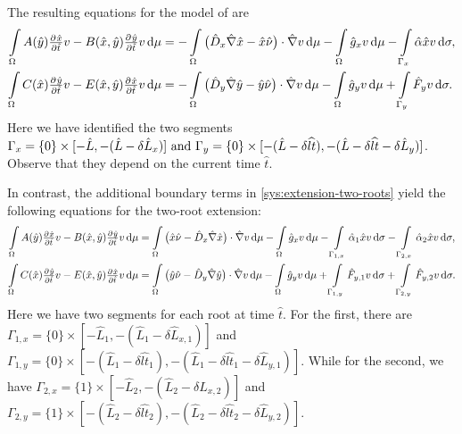 \documentclass[11pt]{article}
\numberwithin{equation}{section}
\begin{document}
The resulting equations for the model of \cite{Ptashnyk-2011} are
\begin{equation}
\label{eq:var-time-model-1}
\begin{aligned}
    \int\limits_\Omega
    A(\hat y) \pd{\hat{x}}{\hat{t}} v 
    -
    B(\hat x, \hat y) \pd{\hat y}{\hat t} v
    \dif\mu
    &=
    -\int\limits_\Omega 
    \big( \hat{D}_x \hat{\nabla} \hat{x} - \hat{x}\hat{\nu}\big) \cdot \hat{\nabla} v \dif\mu
    -\int\limits_\Omega \hat{g}_x v \dif\mu
    -\int\limits_{\Gamma_{x}}    \hat{\alpha} \hat{x} v    \dif \sigma,
    \\
    \int\limits_\Omega
    C(\hat{x})  \pd{\hat{y}}{\hat{t}} v 
    -
    E(\hat{x},\hat{y})  \pd{\hat x}{\hat t} v
    \dif\mu
    &=
    -\int\limits_\Omega 
    \big(\hat{D}_y \hat{\nabla} \hat{y} - \hat{y}\hat{\nu} \big) \cdot \hat{\nabla} v \dif\mu
    -\int\limits_\Omega \hat{g}_y v \dif\mu
    +\int\limits_{\Gamma_{y}}    \hat{F}_y v    \dif \sigma.
\end{aligned}
\end{equation}
Here we have identified the two segments \(\Gamma_{x} = \{0\}\times [-\hat{L}, -(\hat{L}-\delta \hat{L}_x)]$ and $\Gamma_{y} = \{0\}\times [-(\hat{L} - \delta \widehat{lt}), -(\hat{L} - \delta \widehat{lt} - \delta \hat{L}_y)]\). Observe that they depend on the current time \(\hat t\).

In contrast, the additional boundary terms in \eqref{sys:extension-two-roots} yield the following equations for the two-root extension:
\begin{equation}
\label{eq:var-time-model-2}
\begin{aligned}
    \int\limits_\Omega
    A(\hat y) \pd{\hat{x}}{\hat{t}} v 
    -
    B(\hat x, \hat y) \pd{\hat y}{\hat t} v
    \dif\mu
    &=
    \int\limits_\Omega 
    \big( \hat{x}\hat{\nu} - \hat{D}_x \hat{\nabla} \hat{x}\big) \cdot \hat{\nabla} v \dif\mu
    -\int\limits_\Omega \hat{g}_x v \dif\mu
    -\int\limits_{\Gamma_{1,x}}    \hat{\alpha}_1 \hat{x} v    \dif \sigma
    -\int\limits_{\Gamma_{2,x}}    \hat{\alpha}_2 \hat{x} v    \dif \sigma,
    \\
    \int\limits_\Omega
    C(\hat{x})  \pd{\hat{y}}{\hat{t}} v 
    -
    E(\hat{x},\hat{y})  \pd{\hat x}{\hat t} v
    \dif\mu
    &=
    \int\limits_\Omega 
    \big(\hat{y}\hat{\nu} - \hat{D}_y \hat{\nabla} \hat{y} \big) \cdot \hat{\nabla} v \dif\mu
    -\int\limits_\Omega \hat{g}_y v \dif\mu
    +\int\limits_{\Gamma_{1,y}}    \hat{F}_{y,1} v    \dif \sigma
    +\int\limits_{\Gamma_{2,y}}    \hat{F}_{y,2} v    \dif \sigma.
\end{aligned}
\end{equation}
Here we have two segments for each root at time \(\hat t\). For the first, there are \(\Gamma_{1,x} = \{0\}\times [-\hat{L}_1,-(\hat{L}_1 - \delta \hat{L}_{x,1})]\) and \(\Gamma_{1,y} = \{0\}\times [-(\hat{L}_1 - \delta \widehat{lt}_1), -(\hat{L}_1 - \delta \widehat{lt}_1 - \delta \hat{L}_{y,1})] \). While for the second, we have \( \Gamma_{2,x} = \{1\}\times [-\hat{L}_2, -(\hat{L}_2 - \delta \hat{L}_{x,2})]\) and \(\Gamma_{2,y} = \{1\} \times [-(\hat{L}_2 - \delta \widehat{lt}_2), -(\hat{L}_2 - \delta \widehat{lt}_2 - \delta \hat{L}_{y,2})]\). 
\end{document}
